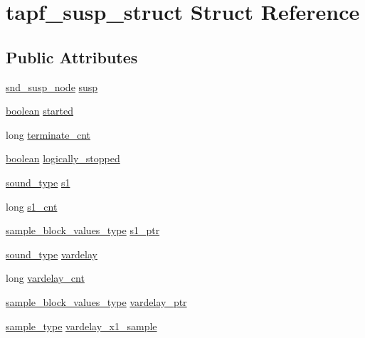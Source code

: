 \hypertarget{structtapf__susp__struct}{}\section{tapf\+\_\+susp\+\_\+struct Struct Reference}
\label{structtapf__susp__struct}
\subsection*{Public Attributes}
\begin{DoxyCompactItemize}
\item 
\hyperlink{sound_8h_a6b268203688a934bd798ceb55f85d4c0}{snd\+\_\+susp\+\_\+node} \hyperlink{structtapf__susp__struct_a5ba5860f7d828bc3961c00f095aeae24}{susp}
\item 
\hyperlink{cext_8h_a7670a4e8a07d9ebb00411948b0bbf86d}{boolean} \hyperlink{structtapf__susp__struct_a9fc475a2f452d8c8ddf993ed19d00d3c}{started}
\item 
long \hyperlink{structtapf__susp__struct_a735f0ede8d334d39fc7122a4ac48dd23}{terminate\+\_\+cnt}
\item 
\hyperlink{cext_8h_a7670a4e8a07d9ebb00411948b0bbf86d}{boolean} \hyperlink{structtapf__susp__struct_a928298edf86d36dda3cac142aee5aea3}{logically\+\_\+stopped}
\item 
\hyperlink{sound_8h_a792cec4ed9d6d636d342d9365ba265ea}{sound\+\_\+type} \hyperlink{structtapf__susp__struct_ac2b5b62620012faed2299de6da96652d}{s1}
\item 
long \hyperlink{structtapf__susp__struct_a58c1915be4d0de483c2bdcc3e1318e3b}{s1\+\_\+cnt}
\item 
\hyperlink{sound_8h_a83d17f7b465d1591f27cd28fc5eb8a03}{sample\+\_\+block\+\_\+values\+\_\+type} \hyperlink{structtapf__susp__struct_aabf632a59ab6fecf08d942f223fb7f1b}{s1\+\_\+ptr}
\item 
\hyperlink{sound_8h_a792cec4ed9d6d636d342d9365ba265ea}{sound\+\_\+type} \hyperlink{structtapf__susp__struct_a27dd6d901a5671ea2fc0117f42d63052}{vardelay}
\item 
long \hyperlink{structtapf__susp__struct_a30fa75ef5ade7798e9acfa44fd4d827c}{vardelay\+\_\+cnt}
\item 
\hyperlink{sound_8h_a83d17f7b465d1591f27cd28fc5eb8a03}{sample\+\_\+block\+\_\+values\+\_\+type} \hyperlink{structtapf__susp__struct_a8429054bbb7f93d73b67bdefaf002194}{vardelay\+\_\+ptr}
\item 
\hyperlink{sound_8h_a3a9d1d4a1c153390d2401a6e9f71b32c}{sample\+\_\+type} \hyperlink{structtapf__susp__struct_a88520f81c2866da73f26e3608a0436bc}{vardelay\+\_\+x1\+\_\+sample}

\end{DoxyCompactItemize}
